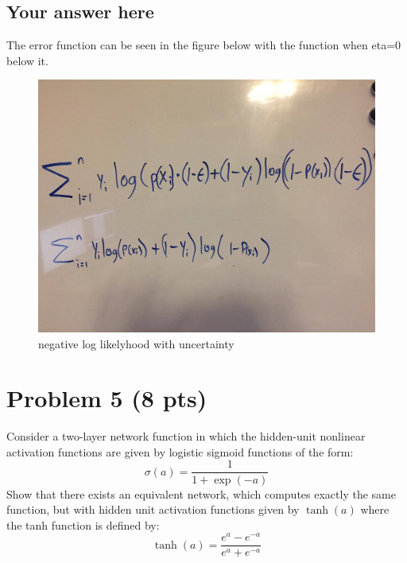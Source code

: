 \documentclass{article}
\begin{document}
\subsection*{Your answer here}

The error function can be seen in the figure below with the function when eta=0 below it.
\begin{figure}[h]
\centering
\includegraphics[width=.5\linewidth]{4.jpg}
\caption{negative log likelyhood with uncertainty}
\label{fig:llfunc}
\end{figure}

\section*{Problem 5 (8 pts)}
Consider a two-layer network function in which the hidden-unit nonlinear activation functions are given by logistic sigmoid functions of the
form:
\begin{equation}
\sigma(a) = \frac{1}{1 + \exp(-a)}
\end{equation}
Show that there exists an equivalent network, which computes exactly the same 
function, but with hidden unit activation functions 
given by $\tanh(a)$ where the tanh function is defined by:
\begin{equation}
\tanh(a) = \frac{e^a - e^{-a}}{e^a + e^{-a}}
\end{equation}
\end{document}
